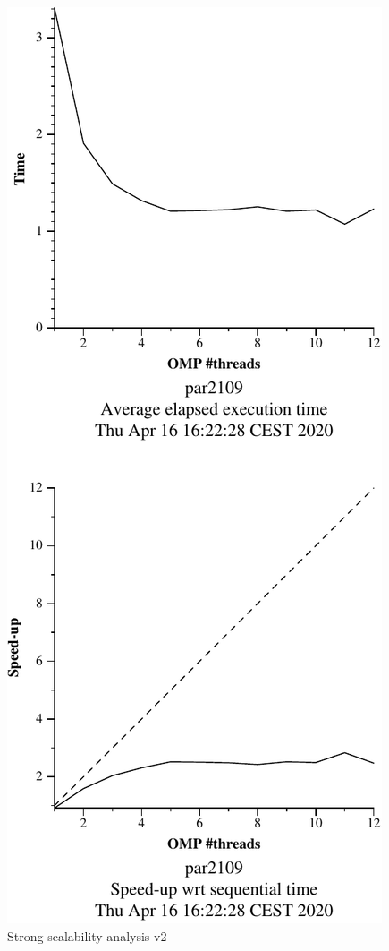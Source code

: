 \begin{figure}[H]
\begin{minipage}{0.5\textwidth}
        \label{fig:ssa_v1} 
    \end{minipage}
    \begin{minipage}{0.5\textwidth}
        \centering
        \includegraphics[width=0.7\linewidth]{plots/v2-crop.pdf}
        \caption{Strong scalability analysis v2}
        \label{fig:ssa_v2} 
    \end{minipage}
\end{figure}

